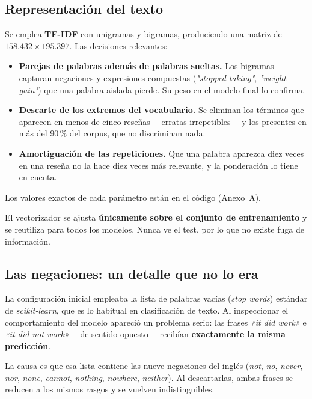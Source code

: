 \documentclass[11pt,a4paper]{article}
\begin{document}
\subsection{Representación del texto}

Se emplea \textbf{TF-IDF} con unigramas y bigramas, produciendo una matriz de
$158.432 \times 195.397$. Las decisiones relevantes:

\begin{itemize}[nosep,leftmargin=*]
  \item \textbf{Parejas de palabras además de palabras sueltas.} Los bigramas
        capturan negaciones y expresiones compuestas (\textit{"stopped taking"},
        \textit{"weight gain"}) que una palabra aislada pierde. Su peso en el
        modelo final lo confirma.
  \item \textbf{Descarte de los extremos del vocabulario.} Se eliminan los
        términos que aparecen en menos de cinco reseñas —erratas irrepetibles—
        y los presentes en más del 90\,\% del corpus, que no discriminan nada.
  \item \textbf{Amortiguación de las repeticiones.} Que una palabra aparezca
        diez veces en una reseña no la hace diez veces más relevante, y la
        ponderación lo tiene en cuenta.
\end{itemize}

Los valores exactos de cada parámetro están en el código (Anexo~A).

El vectorizador se ajusta \textbf{únicamente sobre el conjunto de
entrenamiento} y se reutiliza para todos los modelos. Nunca ve el test, por lo
que no existe fuga de información.

\subsection{Las negaciones: un detalle que no lo era}\label{sec:negaciones}

La configuración inicial empleaba la lista de palabras vacías
(\textit{stop words}) estándar de \textit{scikit-learn}, que es lo habitual en
clasificación de texto. Al inspeccionar el comportamiento del modelo apareció
un problema serio: las frases \textit{«it did work»} e \textit{«it did not
work»} —de sentido opuesto— recibían \textbf{exactamente la misma predicción}.

La causa es que esa lista contiene las nueve negaciones del inglés
(\textit{not}, \textit{no}, \textit{never}, \textit{nor}, \textit{none},
\textit{cannot}, \textit{nothing}, \textit{nowhere}, \textit{neither}). Al
descartarlas, ambas frases se reducen a los mismos rasgos y se vuelven
indistinguibles.
\end{document}

